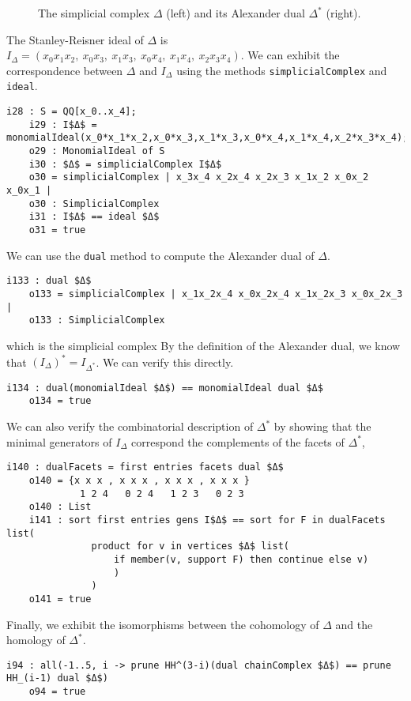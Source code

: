 \documentclass[12pt,leqno]{amsart}
\theoremstyle{definition}
\newenvironment{example}
{\pushQED{\qed}\renewcommand{\qedsymbol}{$\diamond$}\examplex}
{\popQED\endexamplex}
\begin{document}
\begin{example}
\begin{figure}[h]
    \caption{The simplicial complex $\Delta$ (left) and its Alexander dual $\Delta^*$ (right).}\label{the figure 8 and its dual}
  \end{figure}
  The Stanley-Reisner ideal of $\Delta$ is $I_\Delta = (x_0x_1x_2,\ x_0x_3,\ x_1x_3,\ x_0x_4,\ x_1x_4,\ x_2x_3x_4)$. We can exhibit the correspondence between $\Delta$ and $I_\Delta$ using the methods \texttt{simplicialComplex} and \texttt{ideal}.
  \begin{lstlisting}[basicstyle={\ttfamily \scriptsize}, xleftmargin=-23pt]
    i28 : S = QQ[x_0..x_4];
    i29 : I$Δ$ = monomialIdeal(x_0*x_1*x_2,x_0*x_3,x_1*x_3,x_0*x_4,x_1*x_4,x_2*x_3*x_4);
    o29 : MonomialIdeal of S
    i30 : $Δ$ = simplicialComplex I$Δ$
    o30 = simplicialComplex | x_3x_4 x_2x_4 x_2x_3 x_1x_2 x_0x_2 x_0x_1 |
    o30 : SimplicialComplex
    i31 : I$Δ$ == ideal $Δ$
    o31 = true
  \end{lstlisting}
  We can use the \texttt{dual} method to compute the Alexander dual of $\Delta$.
\begin{lstlisting}[basicstyle={\ttfamily \scriptsize}, xleftmargin=-23pt]
    i133 : dual $Δ$
    o133 = simplicialComplex | x_1x_2x_4 x_0x_2x_4 x_1x_2x_3 x_0x_2x_3 |
    o133 : SimplicialComplex
\end{lstlisting}
  which is the simplicial complex
  By the definition of the Alexander dual, we know that $(I_\Delta)^* = I_{\Delta^*}$. We can verify this directly.
\begin{lstlisting}[basicstyle={\ttfamily \scriptsize}, xleftmargin=-23pt]
    i134 : dual(monomialIdeal $Δ$) == monomialIdeal dual $Δ$
    o134 = true
\end{lstlisting}
  We can also verify the combinatorial description of $\Delta^*$ by showing that the minimal generators of $I_\Delta$ correspond the complements of the facets of $\Delta^*$,
\begin{lstlisting}[basicstyle={\ttfamily \scriptsize}, xleftmargin=-23pt]
    i140 : dualFacets = first entries facets dual $Δ$
    o140 = {x x x , x x x , x x x , x x x }
             1 2 4   0 2 4   1 2 3   0 2 3
    o140 : List
    i141 : sort first entries gens I$Δ$ == sort for F in dualFacets list(
               product for v in vertices $Δ$ list(
                   if member(v, support F) then continue else v)
                   )
               )
    o141 = true
\end{lstlisting}
  Finally, we exhibit the isomorphisms between the cohomology of $\Delta$ and the homology of $\Delta^*$.
\begin{lstlisting}[basicstyle={\ttfamily \scriptsize}, xleftmargin=-23pt]
    i94 : all(-1..5, i -> prune HH^(3-i)(dual chainComplex $Δ$) == prune HH_(i-1) dual $Δ$)
    o94 = true
\end{lstlisting}
\end{example}
\end{document}
